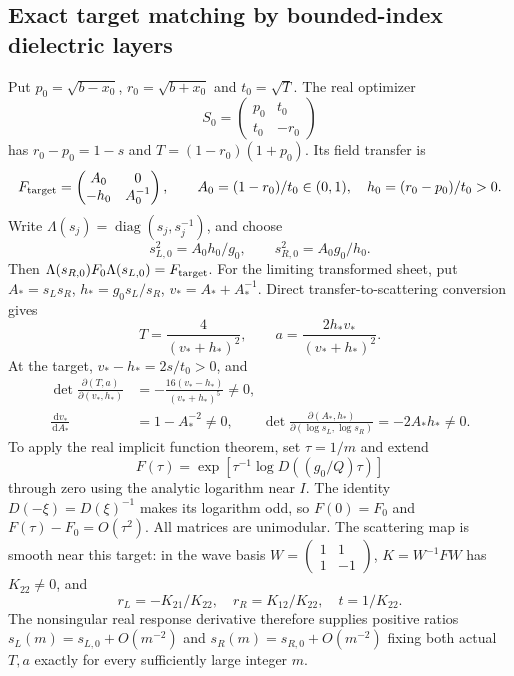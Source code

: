 \documentclass[11pt,a4paper]{article}
\theoremstyle{remark}
\newcommand{\dd}{\,\mathrm d}
\newcommand{\diag}{\operatorname{diag}}
\begin{document}
\subsection{Exact target matching by bounded-index dielectric layers}
Put $p_0=\sqrt{b-x_0}$, $r_0=\sqrt{b+x_0}$ and $t_0=\sqrt T$. The real optimizer
\[
 S_0=\begin{pmatrix}p_0&t_0\\t_0&-r_0\end{pmatrix}
\]
has $r_0-p_0=1-s$ and $T=(1-r_0)(1+p_0)$. Its field transfer is
\[
 F_{\rm target}=\begin{pmatrix}A_0&0\\-h_0&A_0^{-1}\end{pmatrix},\qquad
 A_0=(1-r_0)/t_0\in(0,1),\quad h_0=(r_0-p_0)/t_0>0.
\]
Write $\Lambda(s_j)=\diag(s_j,s_j^{-1})$, and choose
\[
 s_{L,0}^2=A_0h_0/g_0,\qquad s_{R,0}^2=A_0g_0/h_0.
\]
Then $\Lambda(s_{R,0})F_0\Lambda(s_{L,0})=F_{\rm target}$. For the limiting transformed sheet, put $A_*=s_Ls_R$, $h_*=g_0s_L/s_R$, $v_*=A_*+A_*^{-1}$. Direct transfer-to-scattering conversion gives
\[
 T=\frac4{(v_*+h_*)^2},\qquad a=\frac{2h_*v_*}{(v_*+h_*)^2}.
\]
At the target, $v_*-h_*=2s/t_0>0$, and
\begin{align*}
 \det\frac{\partial(T,a)}{\partial(v_*,h_*)}
 &=-\frac{16(v_*-h_*)}{(v_*+h_*)^5}\ne0,\\
 \frac{\dd v_*}{\dd A_*}&=1-A_*^{-2}\ne0,\qquad
 \det\frac{\partial(A_*,h_*)}{\partial(\log s_L,\log s_R)}=-2A_*h_*\ne0.
\end{align*}
To apply the real implicit function theorem, set $\tau=1/m$ and extend
\[
 F(\tau)=\exp\left[\tau^{-1}\log D((g_0/Q)\tau)\right]
\]
through zero using the analytic logarithm near $I$. The identity $D(-\xi)=D(\xi)^{-1}$ makes its logarithm odd, so $F(0)=F_0$ and $F(\tau)-F_0=O(\tau^2)$. All matrices are unimodular. The scattering map is smooth near this target: in the wave basis $W=\left(\begin{smallmatrix}1&1\\1&-1\end{smallmatrix}\right)$, $K=W^{-1}FW$ has $K_{22}\ne0$, and
\[
 r_L=-K_{21}/K_{22},\quad r_R=K_{12}/K_{22},\quad t=1/K_{22}.
\]
The nonsingular real response derivative therefore supplies positive ratios $s_L(m)=s_{L,0}+O(m^{-2})$ and $s_R(m)=s_{R,0}+O(m^{-2})$ fixing both actual $T,a$ exactly for every sufficiently large integer $m$.
\end{document}
